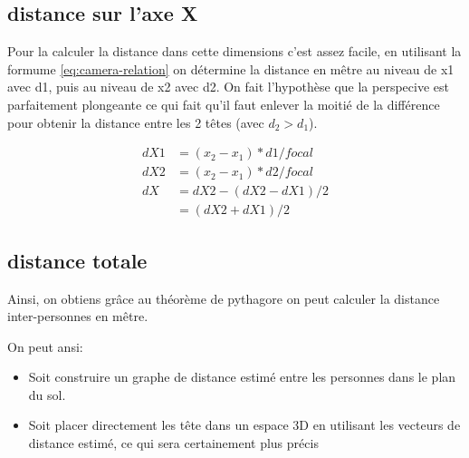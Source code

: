 \subsection{distance sur l'axe X}

Pour la calculer la distance dans cette dimensions c'est assez facile, en utilisant la formume \ref{eq:camera-relation} on détermine la distance en mêtre au niveau de x1 avec d1, puis au niveau de x2 avec d2.
On fait l'hypothèse que la perspecive est parfaitement plongeante ce qui fait qu'il faut enlever la moitié de la différence pour obtenir la distance entre les 2 têtes (avec $d_2>d_1$).

\begin{align}
    dX1 &= (x_2-x_1) * d1 / focal \\
    dX2 &= (x_2-x_1) * d2 / focal \\
    dX  &= dX2 - (dX2-dX1)/2 \\
        &= (dX2 + dX1) /2
\end{align}

\subsection{distance totale}

Ainsi, on obtiens grâce au théorème de pythagore on peut calculer la distance inter-personnes en mêtre.

On peut ansi:

\begin{itemize}
    \item Soit construire un graphe de distance estimé entre les personnes dans le plan du sol.
    \item Soit placer directement les tête dans un espace 3D en utilisant les vecteurs de distance estimé, ce qui sera certainement plus précis 
\end{itemize}

